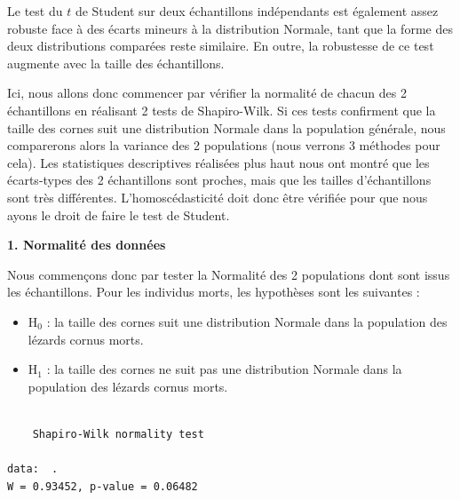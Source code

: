 \documentclass[
  a4paper,
]{article}
\newenvironment{Shaded}{\begin{snugshade}}{\end{snugshade}}
\newcommand{\KeywordTok}[1]{\textcolor[rgb]{0.12,0.11,0.11}{\textbf{#1}}}
\newcommand{\NormalTok}[1]{\textcolor[rgb]{0.12,0.11,0.11}{#1}}
\newcommand{\OperatorTok}[1]{\textcolor[rgb]{0.12,0.11,0.11}{#1}}
\newcommand{\StringTok}[1]{\textcolor[rgb]{0.75,0.01,0.01}{#1}}
\providecommand{\tightlist}{%
  \setlength{\itemsep}{0pt}\setlength{\parskip}{0pt}}
\begin{document}
Le test du \(t\) de Student sur deux échantillons indépendants est également assez robuste face à des écarts mineurs à la distribution Normale, tant que la forme des deux distributions comparées reste similaire. En outre, la robustesse de ce test augmente avec la taille des échantillons.

Ici, nous allons donc commencer par vérifier la normalité de chacun des 2 échantillons en réalisant 2 tests de Shapiro-Wilk. Si ces tests confirment que la taille des cornes suit une distribution Normale dans la population générale, nous comparerons alors la variance des 2 populations (nous verrons 3 méthodes pour cela). Les statistiques descriptives réalisées plus haut nous ont montré que les écarts-types des 2 échantillons sont proches, mais que les tailles d'échantillons sont très différentes. L'homoscédasticité doit donc être vérifiée pour que nous ayons le droit de faire le test de Student.

\textbf{1. Normalité des données}

Nous commençons donc par tester la Normalité des 2 populations dont sont issus les échantillons. Pour les individus morts, les hypothèses sont les suivantes :

\begin{itemize}
\tightlist
\item
  H\(_0\) : la taille des cornes suit une distribution Normale dans la population des lézards cornus morts.
\item
  H\(_1\) : la taille des cornes ne suit pas une distribution Normale dans la population des lézards cornus morts.
\end{itemize}

\begin{Shaded}
\end{Shaded}

\begin{verbatim}

    Shapiro-Wilk normality test

data:  .
W = 0.93452, p-value = 0.06482
\end{verbatim}
\end{document}
